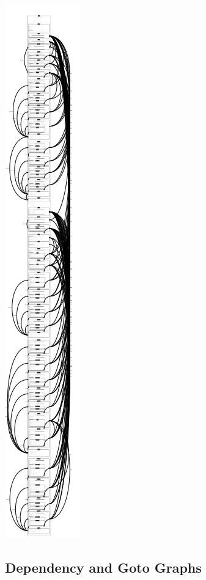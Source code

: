 \begin{center}
\noindent \includegraphics[scale=0.8]{Figures/appendix/steamboiler/zdraoutput.png}
\end{center}

\subsection{Dependency and Goto Graphs}
\label{app:sb2.5}

